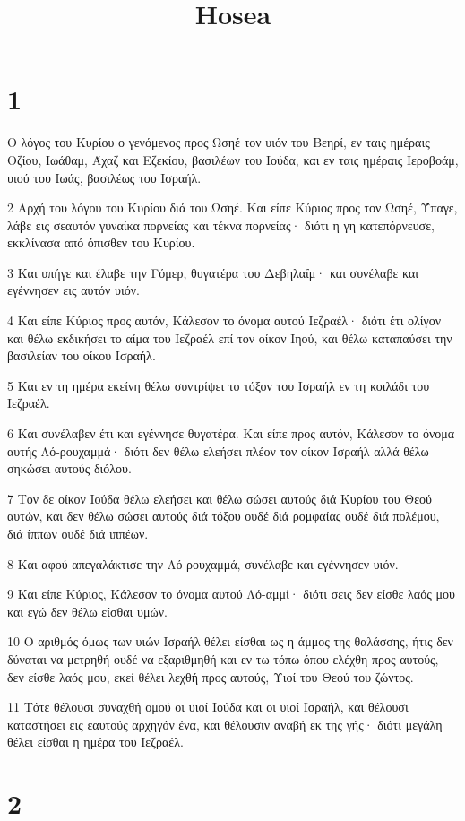 

\title{Hosea}


\chapter{1}

\par Ο λόγος του Κυρίου ο γενόμενος προς Ωσηέ τον υιόν του Βεηρί, εν ταις ημέραις Οζίου, Ιωάθαμ, Άχαζ και Εζεκίου, βασιλέων του Ιούδα, και εν ταις ημέραις Ιεροβοάμ, υιού του Ιωάς, βασιλέως του Ισραήλ.
\par 2 Αρχή του λόγου του Κυρίου διά του Ωσηέ. Και είπε Κύριος προς τον Ωσηέ, Ύπαγε, λάβε εις σεαυτόν γυναίκα πορνείας και τέκνα πορνείας· διότι η γη κατεπόρνευσε, εκκλίνασα από όπισθεν του Κυρίου.
\par 3 Και υπήγε και έλαβε την Γόμερ, θυγατέρα του Δεβηλαΐμ· και συνέλαβε και εγέννησεν εις αυτόν υιόν.
\par 4 Και είπε Κύριος προς αυτόν, Κάλεσον το όνομα αυτού Ιεζραέλ· διότι έτι ολίγον και θέλω εκδικήσει το αίμα του Ιεζραέλ επί τον οίκον Ιηού, και θέλω καταπαύσει την βασιλείαν του οίκου Ισραήλ.
\par 5 Και εν τη ημέρα εκείνη θέλω συντρίψει το τόξον του Ισραήλ εν τη κοιλάδι του Ιεζραέλ.
\par 6 Και συνέλαβεν έτι και εγέννησε θυγατέρα. Και είπε προς αυτόν, Κάλεσον το όνομα αυτής Λό-ρουχαμμά· διότι δεν θέλω ελεήσει πλέον τον οίκον Ισραήλ αλλά θέλω σηκώσει αυτούς διόλου.
\par 7 Τον δε οίκον Ιούδα θέλω ελεήσει και θέλω σώσει αυτούς διά Κυρίου του Θεού αυτών, και δεν θέλω σώσει αυτούς διά τόξου ουδέ διά ρομφαίας ουδέ διά πολέμου, διά ίππων ουδέ διά ιππέων.
\par 8 Και αφού απεγαλάκτισε την Λό-ρουχαμμά, συνέλαβε και εγέννησεν υιόν.
\par 9 Και είπε Κύριος, Κάλεσον το όνομα αυτού Λό-αμμί· διότι σεις δεν είσθε λαός μου και εγώ δεν θέλω είσθαι υμών.
\par 10 Ο αριθμός όμως των υιών Ισραήλ θέλει είσθαι ως η άμμος της θαλάσσης, ήτις δεν δύναται να μετρηθή ουδέ να εξαριθμηθή και εν τω τόπω όπου ελέχθη προς αυτούς, δεν είσθε λαός μου, εκεί θέλει λεχθή προς αυτούς, Υιοί του Θεού του ζώντος.
\par 11 Τότε θέλουσι συναχθή ομού οι υιοί Ιούδα και οι υιοί Ισραήλ, και θέλουσι καταστήσει εις εαυτούς αρχηγόν ένα, και θέλουσιν αναβή εκ της γής· διότι μεγάλη θέλει είσθαι η ημέρα του Ιεζραέλ.

\chapter{2}

